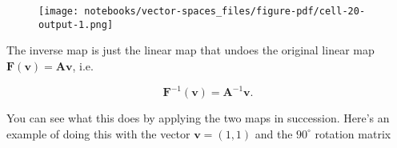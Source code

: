 \documentclass[
  letterpaper,
  DIV=11,
  numbers=noendperiod]{scrreprt}
\newenvironment{Shaded}{\begin{snugshade}}{\end{snugshade}}
\newcommand{\DecValTok}[1]{\textcolor[rgb]{0.68,0.00,0.00}{#1}}
\newcommand{\FloatTok}[1]{\textcolor[rgb]{0.68,0.00,0.00}{#1}}
\newcommand{\NormalTok}[1]{\textcolor[rgb]{0.00,0.23,0.31}{#1}}
\newcommand{\OperatorTok}[1]{\textcolor[rgb]{0.37,0.37,0.37}{#1}}
\newcommand{\SpecialCharTok}[1]{\textcolor[rgb]{0.37,0.37,0.37}{#1}}
\newcommand{\StringTok}[1]{\textcolor[rgb]{0.13,0.47,0.30}{#1}}
\begin{document}
\begin{Shaded}
\end{Shaded}

\begin{figure}[H]

{\centering \texttt{[image: notebooks/vector-spaces\_files/figure-pdf/cell-20-output-1.png]}

}

\end{figure}

The inverse map is just the linear map that undoes the original linear
map \(\mathbf{F}(\mathbf{v}) = \mathbf{A}\mathbf{v}\), i.e.

\[\mathbf{F}^{-1}(\mathbf{v}) = \mathbf{A}^{-1}\mathbf{v}.\]

You can see what this does by applying the two maps in succession.
Here's an example of doing this with the vector \(\mathbf{v}=(1,1)\) and
the \(90^\circ\) rotation matrix
\end{document}
